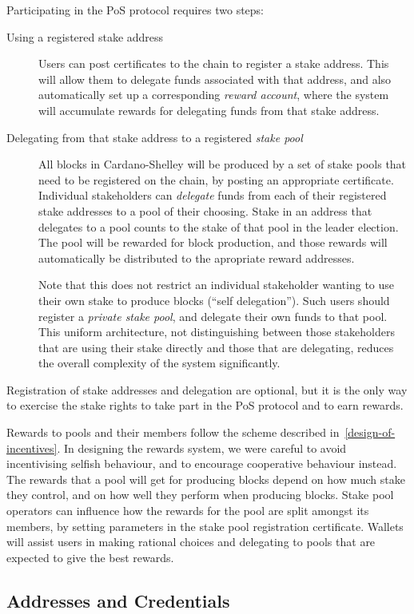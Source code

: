 \documentclass[11pt,a4paper,dvipsnames,twosided]{article}
\begin{document}
Participating in the PoS protocol requires two steps:
\begin{description}
\item[Using a registered stake address] Users can post certificates to the chain
  to register a stake address. This will allow them to delegate funds associated
  with that address, and also automatically set up a corresponding \emph{reward
    account}, where the system will accumulate rewards for delegating funds from
  that stake address.
\item[Delegating from that stake address to a registered \emph{stake pool}] All
  blocks in Cardano-Shelley will be produced by a set of stake pools that need
  to be registered on the chain, by posting an appropriate certificate.
  Individual stakeholders can \emph{delegate} funds from each of their
  registered stake addresses to a pool of their choosing. Stake in an address
  that delegates to a pool counts to the stake of that pool in the leader
  election. The pool will be rewarded for block production, and those rewards
  will automatically be distributed to the apropriate reward addresses.

  Note that this does not restrict an individual stakeholder wanting to use
  their own stake to produce blocks (``self delegation''). Such users should
  register a \emph{private stake pool}, and delegate their own funds to that
  pool. This uniform architecture, not distinguishing between those stakeholders
  that are using their stake directly and those that are delegating, reduces the
  overall complexity of the system significantly.
\end{description}
Registration of stake addresses and delegation are optional, but it is the only
way to exercise the stake rights to take part in the PoS protocol and to earn
rewards.

Rewards to pools and their members follow the scheme described
in~\cref{design-of-incentives}. In designing the rewards system, we were careful
to avoid incentivising selfish behaviour, and to encourage cooperative behaviour
instead. The rewards that a pool will get for producing blocks depend on how
much stake they control, and on how well they perform when producing blocks.
Stake pool operators can influence how the rewards for the pool are split
amongst its members, by setting parameters in the stake pool registration
certificate. Wallets will assist users in making rational choices and delegating
to pools that are expected to give the best rewards.

\subsection{Addresses and Credentials}
\label{address-structure}
\end{document}
